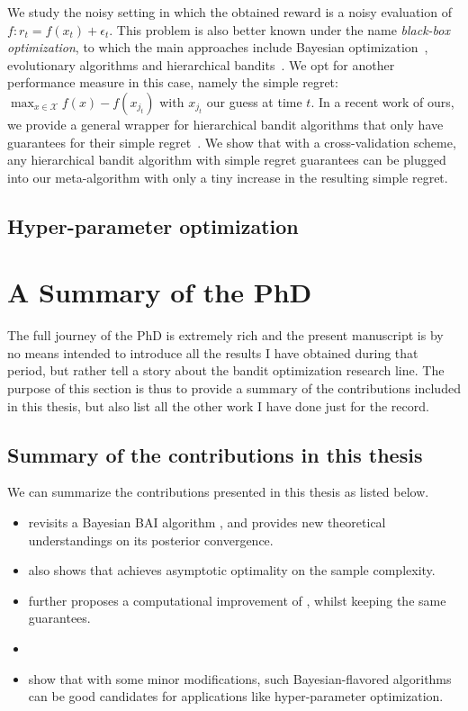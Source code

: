 We study the noisy setting in which the obtained reward is a noisy evaluation of $f: r_t = f(x_t) + \epsilon_t$. This problem is also better known under the name \emph{black-box optimization}, to which the main approaches include Bayesian optimization~\citep{brochu2010bayesian}, evolutionary algorithms and hierarchical bandits~\citep{bubeck2010x}. We opt for another performance measure in this case, namely the simple regret: $\max_{x\in\mathcal{X}} f(x) - f(x_{j_t})$ with $x_{j_t}$ our guess at time $t$. In a recent work of ours, we provide a general wrapper for hierarchical bandit algorithms that only have guarantees for their simple regret~\cite{shang2019adaptive}. We show that with a cross-validation scheme, any hierarchical bandit algorithm with simple regret guarantees can be plugged into our meta-algorithm with only a tiny increase in the resulting simple regret.

\subsection{Hyper-parameter optimization}


\section{A Summary of the PhD}\label{sec:intro.contributions}

The full journey of the PhD is extremely rich and the present manuscript is by no means intended to introduce all the results I have obtained during that period, but rather tell a story about the bandit optimization research line. The purpose of this section is thus to provide a summary of the contributions included in this thesis, but also list all the other work I have done just for the record.

\subsection{Summary of the contributions in this thesis}\label{sec:intro.contributions.summary}

We can summarize the contributions presented in this thesis as listed below.

\begin{itemize}[label=]
    \item \cite{shang2020t3c} revisits a Bayesian BAI algorithm \TTTS, and provides new theoretical understandings on its posterior convergence.
    \item \cite{shang2020t3c} also shows that \TTTS achieves asymptotic optimality on the sample complexity.
    \item \cite{shang2020t3c} further proposes a computational improvement \TCC of \TTTS, whilst keeping the same guarantees.
    \item \cite{degenne2020game}
    \item \cite{shang2019dttts} show that with some minor modifications, such Bayesian-flavored algorithms can be good candidates for applications like hyper-parameter optimization.
\end{itemize}

